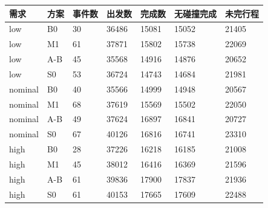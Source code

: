 \begin{tabular}{lllllll}
\toprule
需求 & 方案 & 事件数 & 出发数 & 完成数 & 无碰撞完成 & 未完行程 \\
\midrule
low & B0 & 30 & 36486 & 15081 & 15052 & 21405 \\
low & M1 & 61 & 37871 & 15802 & 15738 & 22069 \\
low & A-B & 45 & 35568 & 14916 & 14876 & 20652 \\
low & S0 & 53 & 36724 & 14743 & 14684 & 21981 \\
nominal & B0 & 40 & 35566 & 14999 & 14948 & 20567 \\
nominal & M1 & 68 & 37619 & 15569 & 15502 & 22050 \\
nominal & A-B & 49 & 37624 & 16897 & 16841 & 20727 \\
nominal & S0 & 67 & 40126 & 16816 & 16741 & 23310 \\
high & B0 & 28 & 37226 & 16218 & 16185 & 21008 \\
high & M1 & 45 & 38012 & 16416 & 16369 & 21596 \\
high & A-B & 61 & 39836 & 17900 & 17837 & 21936 \\
high & S0 & 61 & 40153 & 17665 & 17609 & 22488 \\
\bottomrule
\end{tabular}